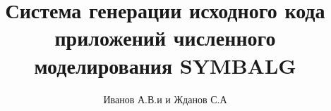 \documentclass[12pt]{article}
\begin{document}
\title{Система генерации исходного кода приложений численного моделирования SYMBALG}
\author{
Иванов А.В.и и Жданов С.А
}

\tableofcontents



\end{document}
